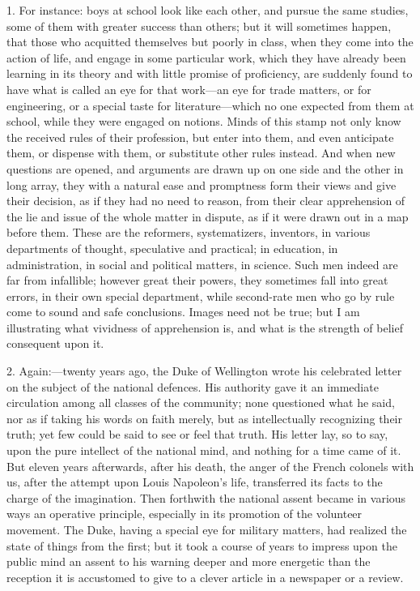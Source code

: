 1. For instance: boys at school look like each other, and pursue
the same studies, some of them with greater success than others; but
it will sometimes happen, that those who acquitted themselves but
poorly in class, when they come into the action of life, and engage in
some particular work, which they have already been learning in its
theory and with little promise of proficiency, are suddenly found to
have what is called an eye for that work—an eye for trade matters,
or for engineering, or a special taste for literature—which no one
expected from them at school, while they were engaged on notions.
Minds of this stamp not only know the received rules of their
profession, but enter into them, and even anticipate them, or dispense
with them, or substitute other rules instead. And when new questions
are opened, and arguments are drawn up on one side and the other in
long array, they with a natural ease and promptness form their views
and give their decision, as if they had no need to reason, from their
clear apprehension of the lie and issue of the whole matter in
dispute, as if it were drawn out in a map before them. These are the
reformers, systematizers, inventors, in various departments of
thought, speculative and practical; in education, in administration,
in social and political matters, in science. Such men indeed are far
from infallible; however great their powers, they sometimes fall into
great errors, in their own special department, while second-rate men
who go by rule come to sound and safe conclusions. Images need not be
true; but I am illustrating what vividness of apprehension is, and
what is the strength of belief consequent upon it.

2. Again:—twenty years ago, the Duke of Wellington wrote his
celebrated letter on the subject of the national defences. His
authority gave it an immediate circulation among all classes of
the community; none questioned what he said, nor as if taking his
words on faith merely, but as intellectually recognizing their truth;
yet few could be said to see or feel that truth. His letter lay, so to
say, upon the pure intellect of the national mind, and nothing for a
time came of it. But eleven years afterwards, after his death, the
anger of the French colonels with us, after the attempt upon Louis
Napoleon's life, transferred its facts to the charge of the
imagination. Then forthwith the national assent became in various ways
an operative principle, especially in its promotion of the volunteer
movement. The Duke, having a special eye for military matters, had
realized the state of things from the first; but it took a course of
years to impress upon the public mind an assent to his warning deeper
and more energetic than the reception it is accustomed to give to a
clever article in a newspaper or a review.

